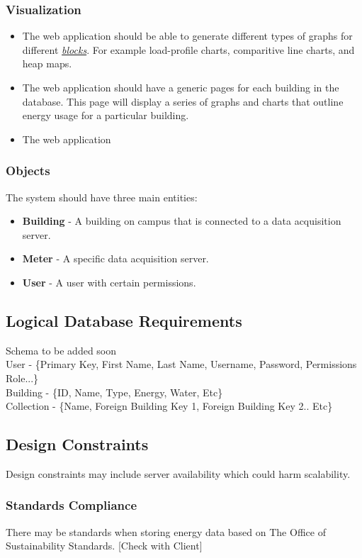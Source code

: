 \documentclass[onecolumn, draftclsnofoot,10pt, compsoc]{IEEEtran}
\begin{document}
    \subsubsection{Visualization}
    \begin{itemize}
        \item The web application should be able to generate different types of graphs for different \hyperref[definition]{\textit{blocks}}. For example load-profile charts, comparitive line charts, and heap maps.
        \item The web application should have a generic pages for each building in the database. This page will display a series of graphs and charts that outline energy usage for a particular building.
        \item The web application 
    \end{itemize}
    \subsubsection{Objects}
        The system should have three main entities: 
        \begin{itemize}
            \item \textbf{Building} - A building on campus that is connected to a data acquisition server.
            \item \textbf{Meter} - A specific data acquisition server.
            \item \textbf{User} - A user with certain permissions.
        \end{itemize}
        
    \subsection{Logical Database Requirements}
    Schema to be added soon\\
    User - \{Primary Key, First Name, Last Name, Username, Password, Permissions Role...\} \\ 
    Building - \{ID, Name, Type, Energy, Water, Etc\}\\
    Collection - \{Name, Foreign Building Key 1, Foreign Building Key 2.. Etc\}
    
    \subsection{Design Constraints}
    Design constraints may include server availability which could harm scalability.
    \subsubsection{Standards Compliance}
    There may be standards when storing energy data based on The Office of Sustainability Standards.
    [Check with Client]
\end{document}
